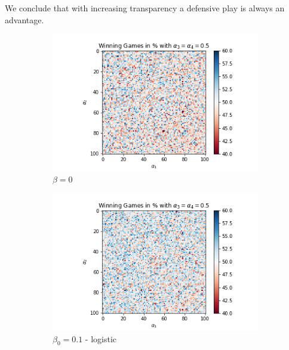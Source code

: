 We conclude that with increasing transparency a defensive play is always an advantage.

\begin{figure}[!ht]
	\centering
	\begin{subfigure}{0.3\textwidth}
	    \centering
	    \includegraphics[width=1\linewidth]{Bilder/simulation_2_2}
	    \caption{$\beta=0$}
	    \label{fig:meine-grafik}
    \end{subfigure}
	\begin{subfigure}{0.3\textwidth}
	    \centering
	    \includegraphics[width=1\linewidth]{Bilder/simulation_3_2}
	    \caption{$\beta_0=0.1$ - logistic}
	    \label{fig:meine-grafik}
    \end{subfigure}
	\begin{subfigure}{0.3\textwidth}
	    \centering

\end{subfigure}
\end{figure}
